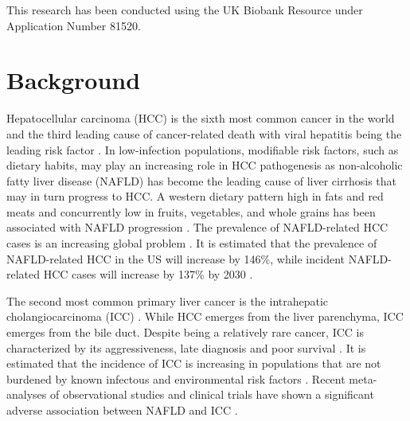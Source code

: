 \documentclass[nutrients,article,submit,moreauthors,pdftex]{Definitions/mdpi}
\begin{document}

This research has been conducted using the UK Biobank Resource under
Application Number 81520.

\hypertarget{sec1}{%
\section{Background}\label{sec1}}

Hepatocellular carcinoma (HCC) is the sixth most common cancer in the
world and the third leading cause of cancer-related death with viral
hepatitis being the leading risk factor \citep{Massarweh2017}. In
low-infection populations, modifiable risk factors, such as dietary
habits, may play an increasing role in HCC pathogenesis as non-alcoholic
fatty liver disease (NAFLD) has become the leading cause of liver
cirrhosis \citep{Younossi2016, Younossi2020} that may in turn progress
to HCC. A western dietary pattern high in fats and red meats and
concurrently low in fruits, vegetables, and whole grains has been
associated with NAFLD progression \citep{Guo2022}. The prevalence of
NAFLD-related HCC cases is an increasing global problem
\citep{Younossi2016}. It is estimated that the prevalence of
NAFLD-related HCC in the US will increase by 146\%, while incident
NAFLD-related HCC cases will increase by 137\% by 2030
\citep{Estes2018}.

The second most common primary liver cancer is the intrahepatic
cholangiocarcinoma (ICC) \citep{Khan2019}. While HCC emerges from the
liver parenchyma, ICC emerges from the bile duct. Despite being a
relatively rare cancer, ICC is characterized by its aggressiveness, late
diagnosis and poor survival \citep{kirstein2016}. It is estimated that
the incidence of ICC is increasing in populations that are not burdened
by known infectous and environmental risk factors \citep{Bergquist2015}.
Recent meta-analyses of observational studies and clinical trials have
shown a significant adverse association between NAFLD and ICC
\citep{Wongjarupong2017, corrao2020}.
\end{document}
